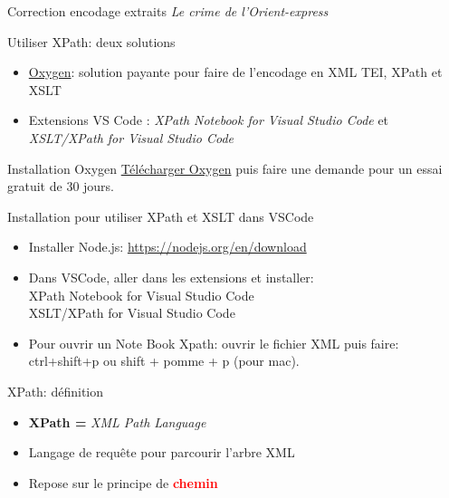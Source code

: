\begin{frame}{Correction encodage extraits \textit{Le crime de l'Orient-express}}
    
\end{frame}

\begin{frame}{Utiliser XPath: deux solutions}
    \begin{itemize}
        \item \href{https://www.oxygenxml.com/}{Oxygen}: solution payante pour faire de l'encodage en XML TEI, XPath et XSLT
        \item Extensions VS Code : \textit{XPath Notebook for Visual Studio Code} et \textit{XSLT/XPath for Visual Studio Code}
    \end{itemize}
\end{frame}

\begin{frame}{Installation Oxygen}
    \href{https://www.oxygenxml.com/xml_editor/download_oxygenxml_editor.html?os=Linux}{Télécharger Oxygen} puis faire une demande pour un essai gratuit de 30 jours.
\end{frame}
\begin{frame}{Installation pour utiliser XPath et XSLT dans VSCode}
    \begin{itemize}
        \item Installer Node.js: \url{https://nodejs.org/en/download}
        \item Dans VSCode, aller dans les extensions et installer:\\
        XPath Notebook for Visual Studio Code\\
        XSLT/XPath for Visual Studio Code
        \item Pour ouvrir un Note Book Xpath: ouvrir le fichier XML puis faire: ctrl+shift+p ou shift + pomme + p (pour mac).
    \end{itemize}
\end{frame}

\begin{frame}{XPath: définition}
\begin{itemize}
    \item \textbf{XPath =} \textit{XML Path Language}
    \item Langage de requête pour parcourir l'arbre XML
    \item Repose sur le principe de \textbf{\textcolor{red}{chemin}}
\end{itemize}
    
\end{frame}

